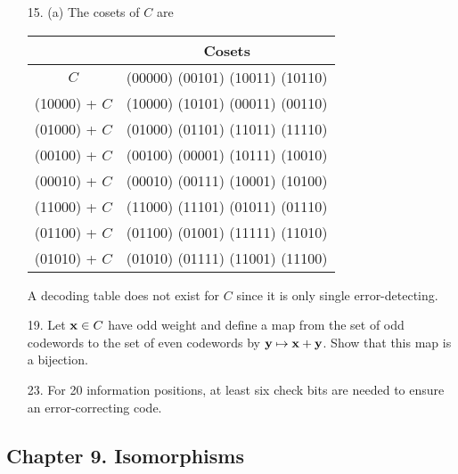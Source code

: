 {\begin{itemize}
 
\item[15.]
(a) The cosets of $C$ are 
\begin{center}
\begin{tabular}{|c|c|}
\hline
 & Cosets \\
\hline
          $C$ & (00000)  (00101)  (10011)  (10110) \\
(10000) + $C$ & (10000)  (10101)  (00011)  (00110) \\
(01000) + $C$ & (01000)  (01101)  (11011)  (11110) \\
(00100) + $C$ & (00100)  (00001)  (10111)  (10010) \\
(00010) + $C$ & (00010)  (00111)  (10001)  (10100) \\
(11000) + $C$ & (11000)  (11101)  (01011)  (01110) \\
(01100) + $C$ & (01100)  (01001)  (11111)  (11010) \\
(01010) + $C$ & (01010)  (01111)  (11001)  (11100) \\
\hline
\end{tabular}
\end{center}
A decoding table does not exist for $C$ since it is only single
error-detecting.  
 
\item[19.]
Let ${\bold x} \in C$ have odd weight and define a map from the set of
odd codewords to the set of even codewords by ${\bold y} \mapsto
{\bold x} + {\bold y}$. Show that this map is a bijection.
 
 
\item[23.]
For 20 information positions, at least six check bits are needed to
ensure an error-correcting code.
 
\end{itemize}
}
 
\subsection*{Chapter 9. Isomorphisms}
 
